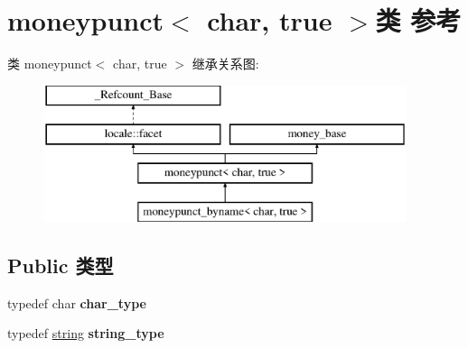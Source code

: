 \hypertarget{classmoneypunct_3_01char_00_01true_01_4}{}\section{moneypunct$<$ char, true $>$类 参考}
\label{classmoneypunct_3_01char_00_01true_01_4}
类 moneypunct$<$ char, true $>$ 继承关系图\+:\begin{figure}[H]
\begin{center}
\leavevmode
\includegraphics[height=4.000000cm]{classmoneypunct_3_01char_00_01true_01_4}
\end{center}
\end{figure}
\subsection*{Public 类型}
\begin{DoxyCompactItemize}
\item 
\mbox{\label{classmoneypunct_3_01char_00_01true_01_4_abf2585cf85aac26ea7a43247e9b4c73b}} 
typedef char {\bfseries char\+\_\+type}
\item 
\mbox{\label{classmoneypunct_3_01char_00_01true_01_4_a322aa5c8bef688df53586e783ebfda8c}} 
typedef \hyperlink{structstring}{string} {\bfseries string\+\_\+type}
\end{DoxyCompactItemize}
